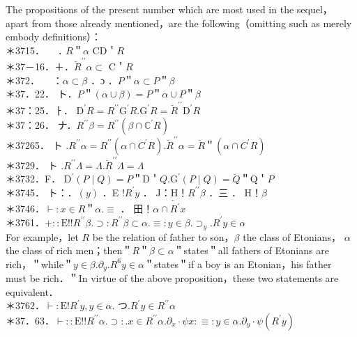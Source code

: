\documentclass[10pt]{article}
\begin{document}
The propositions of the present number which are most used in the sequel， apart from those already mentioned，are the following（omitting such as merely embody definitions）：\\
＊3715．$\quad$ ․ $R$＂$\alpha$ CD＇$R$\\
＊37－16．＋．$\breve{R}^{\prime \prime} \alpha \subset$ C＇$R$\\
＊372．$\quad$ ：$\alpha \subset \beta$ ．ɔ ．$P$＂$\alpha \subset P$＂$\beta$\\
＊37．22． ト．$P$＂$(\alpha \cup \beta)=P$＂$\alpha \cup P$＂$\beta$\\
＊37：25．ㅏ． $\mathrm{D}^{\prime} R=R^{\prime \prime} \mathrm{G}^{\prime} R . \mathrm{G}^{\prime} R=\breve{R}^{\prime \prime} \mathrm{D}^{\prime} R$\\
＊37：26． ナ．$R^{\prime \prime} \beta=R^{\prime \prime}\left(\beta \cap \mathbb{C}^{\prime} R\right)$\\
＊37265． ト $. R^{\prime \prime} \alpha=R^{\prime \prime}\left(\alpha \cap C^{\prime} R\right) . \breve{R}^{\prime \prime} \alpha=\breve{R}$＂$\left(\alpha \cap C^{\prime} R\right)$\\
＊3729． ト $. R^{\prime \prime} \Lambda=\Lambda . \breve{R}^{\prime \prime} \Lambda=\Lambda$\\
＊3732．F． $\mathrm{D}^{\prime}(P \mid Q)=P$＂D＇$Q . \mathrm{G}^{\prime}(P \mid Q)=\breve{Q}$＂Q＇$P$\\
＊3745． ト：．$(y)$ ．E $!R^{\prime} y$ ． J：H！$R^{\prime \prime} \beta$ ．三 ． H！$\beta$\\
＊3746．$\vdash: x \in R$＂$\alpha . \equiv$ ． 田！$\alpha \cap \overleftarrow{R^{\prime}} x$\\
＊3761．$+:: \mathrm{E}!!R^{\prime \prime} \beta . \supset: R^{\prime \prime} \beta \subset \alpha . \equiv: y \in \beta . \supset_{y} . R^{\prime} y \in \alpha$\\
For example，let $R$ be the relation of father to son，$\beta$ the class of Etonians， $\alpha$ the class of rich men；then＂$R$＂$\beta \subset \alpha$＂states＂all fathers of Etonians are rich，＂while＂$y \in \beta . \partial_{y} . R^{6} y \in \alpha$＂states＂if a boy is an Etonian，his father\\
must be rich．＂In virtue of the above proposition，these two statements are equivalent．\\
＊3762．$\vdash: \mathrm{E}!R^{\prime} y, y \in \alpha$. つ.$R^{\prime} y \in R^{\prime \prime} \alpha$\\
＊37．63．$\vdash:: \mathrm{E}!!R^{\prime \prime} \alpha . \supset: . x \in R^{\prime \prime} \alpha . \partial_{x} \cdot \psi x: \equiv: y \in \alpha . \partial_{y} \cdot \psi\left(R^{\prime} y\right)$\\
\end{document}
